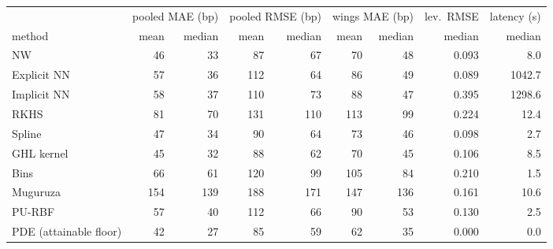 \begin{tabular}{l rr rr rr r r}
\toprule
 & \multicolumn{2}{c}{pooled MAE (bp)} & \multicolumn{2}{c}{pooled RMSE (bp)} & \multicolumn{2}{c}{wings MAE (bp)} & lev.\ RMSE & latency (s)\\
\cmidrule(lr){2-3}\cmidrule(lr){4-5}\cmidrule(lr){6-7}
method & mean & median & mean & median & mean & median & median & median\\
\midrule
NW & 46 & 33 & 87 & 67 & 70 & 48 & 0.093 & 8.0\\
Explicit NN & 57 & 36 & 112 & 64 & 86 & 49 & 0.089 & 1042.7\\
Implicit NN & 58 & 37 & 110 & 73 & 88 & 47 & 0.395 & 1298.6\\
RKHS & 81 & 70 & 131 & 110 & 113 & 99 & 0.224 & 12.4\\
Spline & 47 & 34 & 90 & 64 & 73 & 46 & 0.098 & 2.7\\
GHL kernel & 45 & 32 & 88 & 62 & 70 & 45 & 0.106 & 8.5\\
Bins & 66 & 61 & 120 & 99 & 105 & 84 & 0.210 & 1.5\\
Muguruza & 154 & 139 & 188 & 171 & 147 & 136 & 0.161 & 10.6\\
PU-RBF & 57 & 40 & 112 & 66 & 90 & 53 & 0.130 & 2.5\\
PDE (attainable floor) & 42 & 27 & 85 & 59 & 62 & 35 & 0.000 & 0.0\\
\bottomrule
\end{tabular}
